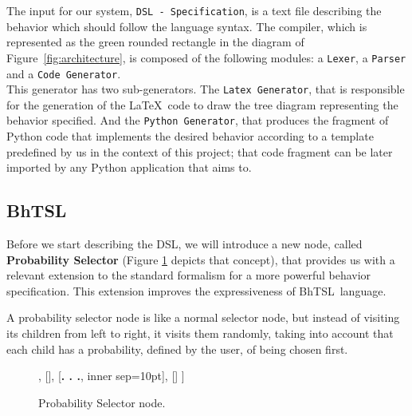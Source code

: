 \documentclass[a4paper,UKenglish,cleveref, autoref, thm-restate]{oasics-v2019}
\def\bht{BhTSL}
\begin{document}
The input for our system, \texttt{DSL - Specification}, is a text file describing the behavior which 
should follow the language syntax.
The compiler, which is represented as the green rounded rectangle in the diagram of Figure~\ref{fig:architecture}, 
is composed of the following modules: a \texttt{Lexer}, a \texttt{Parser} and a \texttt{Code Generator}.\\
This generator has two sub-generators.
The \texttt{Latex Generator}, that is responsible for the generation of the \LaTeX\ code to draw
the tree diagram representing the behavior specified.
And the \texttt{Python Generator}, that produces the fragment of Python code that implements
the desired  behavior according to a template predefined by us in the context of this project;
that code fragment can be later imported by  any Python application that aims to.

\subsection{\bht}

Before we start describing the DSL, we will introduce a new node, called \textbf{Probability Selector} 
(Figure \ref{fig:prob_selector} depicts that concept), that  provides us with a relevant extension to the standard
formalism for a more powerful  behavior specification.
This extension improves the expressiveness of \bht\ language.

A probability selector node is like a normal selector node, but instead of visiting its children from left to right, 
it visits them randomly, taking into account that each child has a probability, defined by the user, 
of being chosen first.

\begin{figure}[H]
    \centering
    \begin{behavior}
        [\probselector
            [\probnodeaction{$P_1$}{Child 1}],
            [],
            [{\textbf{. . .}}, inner sep=10pt],
            []
        ]
    \end{behavior}
    \caption{Probability Selector node.}
    \label{fig:prob_selector}
\end{figure}
\end{document}
